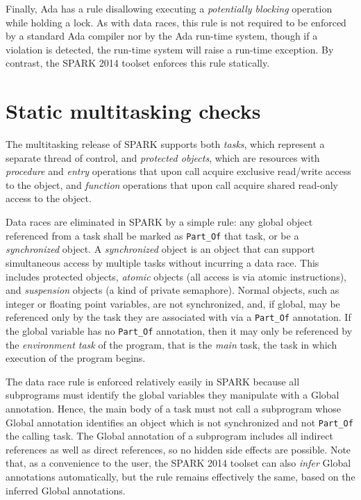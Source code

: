 \documentclass[conference,compsoc]{IEEEtran}
\begin{document}
Finally, Ada has a rule disallowing executing a \emph{potentially blocking}
operation while holding a lock. As with data races, this rule is not
required to be enforced by a standard Ada compiler nor by the Ada run-time
system, though if a violation is detected, the run-time system will raise a
run-time exception. By contrast, the SPARK 2014 toolset enforces this rule
statically.

\section{Static multitasking checks}
The multitasking release of SPARK supports both \emph{tasks}, which
represent a separate thread of control, and \emph{protected objects}, which
are resources with \emph{procedure} and \emph{entry} operations that upon
call acquire exclusive read/write access to the object, and \emph{function}
operations that upon call acquire shared read-only access to the object.

Data races are eliminated in SPARK by a simple rule: any global object
referenced from a task shall be marked as \verb|Part_Of| that task, or be a
\emph{synchronized} object. A \emph{synchronized} object is an object that
can support simultaneous access by multiple tasks without incurring a data
race. This includes protected objects, \emph{atomic} objects (all access is
via atomic instructions), and \emph{suspension} objects (a kind of private
semaphore). Normal objects, such as integer or floating point variables,
are not synchronized, and, if global, may be referenced only by the task
they are associated with via a \verb|Part_Of| annotation. If the global
variable has no \verb|Part_Of| annotation, then it may only be referenced
by the \emph{environment task} of the program, that is the \emph{main}
task, the task in which execution of the program begins.

The data race rule is enforced relatively easily in SPARK because all
subprograms must identify the global variables they manipulate with a
Global annotation. Hence, the main body of a task must not call a
subprogram whose Global annotation identifies an object which is not
synchronized and not \verb|Part_Of| the calling task. The Global annotation
of a subprogram includes all indirect references as well as direct
references, so no hidden side effects are possible. Note that, as a
convenience to the user, the SPARK 2014 toolset can also \emph{infer}
Global annotations automatically, but the rule remains effectively the
same, based on the inferred Global annotations.
\end{document}
